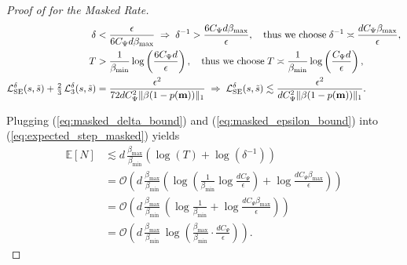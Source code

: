 \documentclass{article} %
\def\eqref#1{equation~\ref{#1}}
\newcommand{\bfm}{{\bf m}}
\newcommand{\LSE}{\mathcal{L}_{\mathrm{SE}}}
\renewcommand{\eqref}[1]{\textup{(\ref{#1})}}
\newcommand{\LThree}{\mathcal{L}_{3}}
\newcommand{\betamax}{\beta_{\mathrm{max}}}
\newcommand{\betamin}{\beta_{\mathrm{min}}}
\begin{document}
\begin{proof}[Proof of  for the Masked Rate]
    \begin{align}
         \delta &< \frac{\epsilon}{6 C_\Psi d \betamax} \;\Rightarrow \; \delta^{-1} > \frac{6 C_\Psi d \betamax}{\epsilon} , \quad \text{thus we choose} \; \delta^{-1} \asymp \frac{d C_\Psi \betamax }{\epsilon}, \label{eq:masked_delta_bound}\\
        T  &> \frac{1}{\betamin} \log\left( \frac{6C_\Psi d}{\epsilon} \right), \quad \text{thus we choose} \; T \asymp \frac{1}{\betamin} \log\left( \frac{C_\Psi d}{\epsilon} \right), \label{eq:masked_epsilon_bound}\\
        \LSE^\delta(s, \tilde{s}) + \tfrac{2}{3}\,\LThree^\delta(s, \tilde{s}) &= \frac{\epsilon^2}{72 d C_\Psi^2 \| \beta (1-p(\bfm))\|_1} \;\Rightarrow \; \LSE^\delta(s, \tilde{s}) \lesssim \frac{\epsilon^2}{ d C_\Psi^2 \| \beta (1-p(\bfm))\|_1}.
    \end{align}

    Plugging \eqref{eq:masked_delta_bound} and \eqref{eq:masked_epsilon_bound} into \eqref{eq:expected_step_masked} yields
    \begin{align*}
        \mathbb{E}[N] &\lesssim d \,\frac{\betamax}{\beta_{\mathrm{min}}} (\log(T) + \log(\delta^{-1}))\\
        &= \mathcal{O}\left(d \,\frac{\betamax}{\beta_{\mathrm{min}}} \left( \log \left( \frac{1}{\betamin} \log\frac{d C_\Psi}{\epsilon} \right) + \log\frac{d C_\Psi \betamax}{\epsilon} \right) \right) \\
        &= \mathcal{O}\left(d \, \frac{\betamax}{\beta_{\mathrm{min}}} \, \left( \log\frac{1}{\betamin} + \log\frac{d C_\Psi \betamax}{\epsilon} \right) \right)\\
        &= \mathcal{O}\left(d \, \frac{\betamax}{\beta_{\mathrm{min}}} \,  \log \left( \frac{\betamax}{\betamin}\cdot \frac{d C_\Psi}{\epsilon}  \right) \right) .
    \end{align*}
\end{proof}
\end{document}
